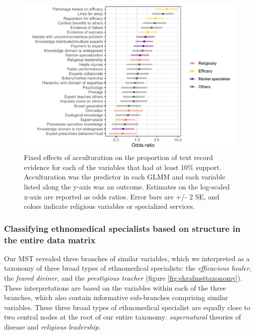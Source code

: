 \documentclass[
  11pt,
]{article}
\begin{document}
\begin{figure}
\centering
\includegraphics{magic-healers-article2_files/figure-latex/ehrafAcculturation-1.pdf}
\caption{\label{fig:ehrafAcculturation}Fixed effects of acculturation on the proportion of text record evidence for each of the variables that had at least 10\% support. Acculturation was the predictor in each GLMM and each variable listed along the y-axis was an outcome. Estimates on the log-scaled x-axis are reported as odds ratios. Error bars are +/- 2 SE, and colors indicate religious variables or specialized services.}
\end{figure}

\hypertarget{classifying-ethnomedical-specialists-based-on-structure-in-the-entire-data-matrix}{%
\subsubsection{Classifying ethnomedical specialists based on structure in the entire data matrix}\label{classifying-ethnomedical-specialists-based-on-structure-in-the-entire-data-matrix}}

Our MST revealed three branches of similar variables, which we interpreted as a taxonomy of three broad types of ethnomedical specialists: the \emph{efficacious healer}, the \emph{feared diviner}, and the \emph{prestigious teacher} (figure \ref{fig:ehrafmsttaxonomy}). These interpretations are based on the variables within each of the three branches, which also contain informative sub-branches comprising similar variables. These three broad types of ethnomedical specialist are equally close to two central nodes at the root of our entire taxonomy: \emph{supernatural} theories of disease and \emph{religious leadership}.
\end{document}
